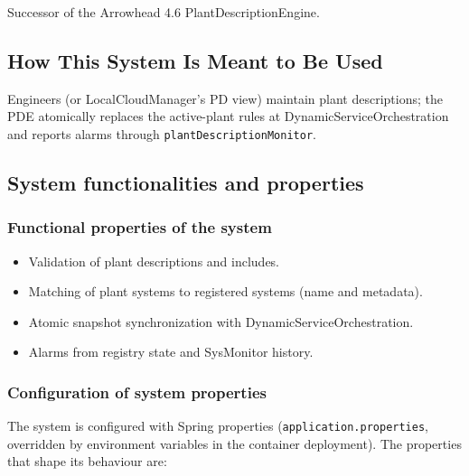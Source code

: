 \documentclass[a4paper]{arrowhead}
\begin{document}
Successor of the Arrowhead 4.6 Plant\allowbreak{}Description\allowbreak{}Engine.

\subsection{How This System Is Meant to Be Used}
\label{sec:use}

Engineers (or LocalCloudManager's PD view) maintain plant descriptions; the PDE atomically replaces the active-plant rules at Dynamic\allowbreak{}Service\allowbreak{}Orchestration and reports alarms through \texttt{plant\allowbreak{}Description\allowbreak{}Monitor}.

\subsection{System functionalities and properties}
\label{sec:properties}

\subsubsection{Functional properties of the system}

\begin{itemize}
  \item Validation of plant descriptions and includes.
  \item Matching of plant systems to registered systems (name and metadata).
  \item Atomic snapshot synchronization with Dynamic\allowbreak{}Service\allowbreak{}Orchestration.
  \item Alarms from registry state and SysMonitor history.
\end{itemize}

\subsubsection{Configuration of system properties}

The system is configured with Spring properties (\texttt{application.properties}, overridden by environment variables in the container deployment). The properties that shape its behaviour are:
\end{document}
